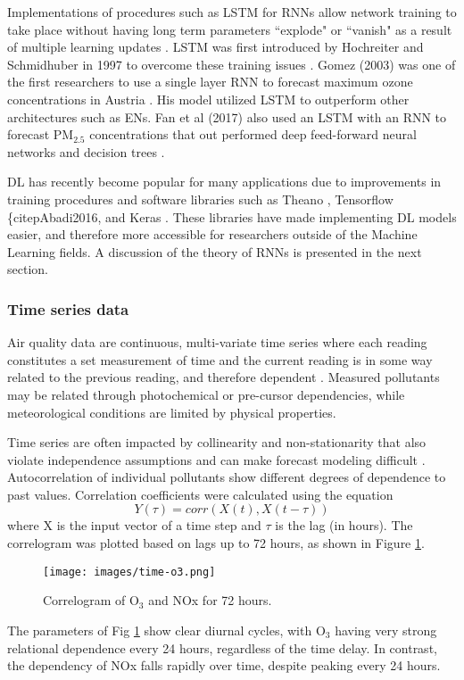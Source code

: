 Implementations of procedures such as LSTM for RNNs allow network training to take place without having long term parameters ``explode" or ``vanish" as a result of multiple learning updates \citep{Pascanu2013}. LSTM was first introduced by Hochreiter and Schmidhuber in 1997  to overcome these training issues \citep{Hochreiter1997}. Gomez (2003) was one of the first researchers to use a single layer RNN to forecast maximum ozone concentrations in Austria \citep{Gomez2003}. His model utilized LSTM to outperform other architectures such as ENs. Fan et al (2017) also used an LSTM with an RNN to forecast PM$_{2.5}$ concentrations that out performed deep feed-forward neural networks and decision trees \citep{Fan2017}.  

DL has recently become popular for many applications due to improvements in training procedures and software libraries such as Theano \citep{Theano2016}, Tensorflow \{citep{Abadi2016}, and Keras \citep{keras2015}. These libraries have made implementing DL models easier, and therefore more accessible for researchers outside of the Machine Learning fields. A discussion of the theory of RNNs is presented in the next section.

\subsubsection{Time series data}
Air quality data are continuous, multi-variate time series where each reading constitutes a set measurement of time and the current reading is in some way related to the previous reading, and therefore dependent \citep{Gheyas2011}. Measured pollutants may be related through photochemical or pre-cursor dependencies, while meteorological conditions are limited by physical properties. 

Time series are often impacted by collinearity and non-stationarity that also violate independence assumptions and can make forecast modeling difficult \citep{Gheyas2011}. Autocorrelation of individual pollutants show different degrees of dependence to past values.  Correlation coefficients were calculated using the equation
%
\begin{equation}
\label{eq:corr}
Y(\tau)= corr(X(t),X(t - \tau))
\end{equation}
%
\noindent
where X is the input vector of a time step and $\tau$ is the lag (in hours). The correlogram was plotted based on lags up to 72 hours, as shown in Figure \ref{fig:serialcorr}.
%
\begin{figure}[H]
\centering
\texttt{[image: images/time-o3.png]}  %
\caption{Correlogram of O$_{3}$ and NOx for 72 hours.}
\label{fig:serialcorr}
\end{figure}
%
The parameters of Fig \ref{fig:serialcorr} show clear diurnal cycles, with O$_{3}$ having very strong relational dependence every 24 hours, regardless of the time delay. In contrast, the dependency of NOx falls rapidly over time, despite peaking every 24 hours. 

